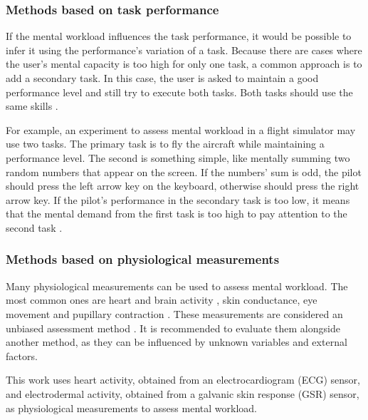     \subsubsection*{Methods based on task performance}
    
        If the mental workload influences the task performance, it would be possible to infer it using the performance's variation of a task. Because there are cases where the user's mental capacity is too high for only one task, a common approach is to add a secondary task. In this case, the user is asked to maintain a good performance level and still try to execute both tasks. Both tasks should use the same skills \cite{stanton2004handbook, sanders1998human}.
        
        For example, an experiment to assess mental workload in a flight simulator may use two tasks. The primary task is to fly the aircraft while maintaining a performance level. The second is something simple, like mentally summing two random numbers that appear on the screen. If the numbers’ sum is odd, the pilot should press the left arrow key on the keyboard, otherwise should press the right arrow key. If the pilot's performance in the secondary task is too low, it means that the mental demand from the first task is too high to pay attention to the second task \cite{mohanavelu2020cognitive}.
        
    \subsubsection*{Methods based on physiological measurements}
    
        Many physiological measurements can be used to assess mental workload. The most common ones are heart and brain activity \cite{chakladar2020eeg, orlandi2018measuring}, skin conductance, eye movement and pupillary contraction \cite{stanton2004handbook, rodriguez2015pupillometry}. These measurements are considered an unbiased assessment method \cite{fallahi2016effects}. It is recommended to evaluate them alongside another method, as they can be influenced by unknown variables and external factors.

        This work uses heart activity, obtained from an electrocardiogram (ECG) sensor, and electrodermal activity, obtained from a galvanic skin response (GSR) sensor, as physiological measurements to assess mental workload.
                
